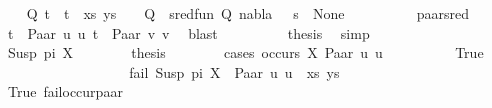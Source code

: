 \begin{isabellebody}
\ \isamarkupfalse%
\ {\isachardoublequoteopen}{\isasymexists}{\isasymsigma}\ Q{\isachardot}{\kern0pt}\ {\isacharparenleft}{\kern0pt}{\isacharparenleft}{\kern0pt}t{}\ {\isasymapprox}{\isacharquery}{\kern0pt}\ t{}{\isacharparenright}{\kern0pt}\ {\isacharhash}{\kern0pt}\ xs{\isacharcomma}{\kern0pt}\ ys{\isacharparenright}{\kern0pt}\ {\isasymturnstile}\ {\isasymsigma}\ {\isasymleadsto}\ Q\ {\isasymand}\ sred{\isacharunderscore}{\kern0pt}fun\ {\isacharparenleft}{\kern0pt}Q{\isacharcomma}{\kern0pt}\ nabla{\isacharcomma}{\kern0pt}\ {\isasymsigma}\ {\isasymbullet}\ s{\isacharparenright}{\kern0pt}\ {\isacharequal}{\kern0pt}\ None{\isachardoublequoteclose}\isanewline
\ \ \ \ \ \ \ \ \isamarkupfalse%
\ paar{\isacharunderscore}{\kern0pt}sred\ \isamarkupfalse%
\ {\isacartoucheopen}t{}\ {\isacharequal}{\kern0pt}\ Paar\ u{}\ u{}{\isacartoucheclose}\ {\isacartoucheopen}t{}\ {\isacharequal}{\kern0pt}\ Paar\ v{}\ v{}{\isacartoucheclose}\ \isamarkupfalse%
\ blast\isanewline
\ \ \ \ \ \ \isamarkupfalse%
\ \isamarkupfalse%
\ {\isacharquery}{\kern0pt}thesis\ \isamarkupfalse%
\ simp\isanewline
\ \ \ \ \isamarkupfalse%
\isanewline
\ \ \ \ \ \ \isamarkupfalse%
\ {\isacharparenleft}{\kern0pt}Susp\ pi\ X{\isacharparenright}{\kern0pt}\isanewline
\ \ \ \ \ \ \isamarkupfalse%
\ {\isacharquery}{\kern0pt}thesis\isanewline
\ \ \ \ \ \ \isamarkupfalse%
\ {\isacharparenleft}{\kern0pt}cases\ {\isachardoublequoteopen}occurs\ X\ {\isacharparenleft}{\kern0pt}Paar\ u{}\ u{}{\isacharparenright}{\kern0pt}{\isachardoublequoteclose}{\isacharparenright}{\kern0pt}\isanewline
\ \ \ \ \ \ \ \ \isamarkupfalse%
\ True\isanewline
\ \ \ \ \ \ \ \ %
\isanewline
\ \ \ \ \ \ \ \ \isamarkupfalse%
\ {\isachardoublequoteopen}fail\ {\isacharparenleft}{\kern0pt}{\isacharparenleft}{\kern0pt}Susp\ pi\ X\ {\isasymapprox}{\isacharquery}{\kern0pt}\ Paar\ u{}\ u{}{\isacharparenright}{\kern0pt}\ {\isacharhash}{\kern0pt}\ xs{\isacharcomma}{\kern0pt}\ ys{\isacharparenright}{\kern0pt}{\isachardoublequoteclose}\isanewline
\ \ \ \ \ \ \ \ \ \ \isamarkupfalse%
\ True\ fail{\isacharunderscore}{\kern0pt}occur{\isacharunderscore}{\kern0pt}paar\ \isamarkupfalse%

\end{isabellebody}
